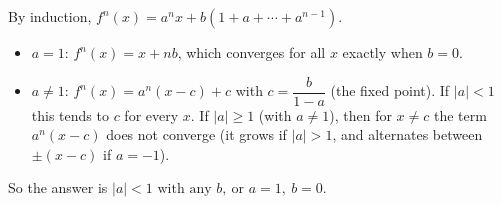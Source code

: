 By induction, $f^n(x)=a^nx+b\left(1+a+\cdots+a^{n-1}\right)$.
\begin{itemize}
\item $a=1$: $f^n(x)=x+nb$, which converges for all $x$ exactly when $b=0$.
\item $a\ne1$: $f^n(x)=a^n\left(x-c\right)+c$ with $c=\dfrac{b}{1-a}$ (the fixed point). If $|a|<1$ this tends to $c$ for every $x$. If $|a|\ge1$ (with $a\ne1$), then for $x\ne c$ the term $a^n(x-c)$ does not converge (it grows if $|a|>1$, and alternates between $\pm(x-c)$ if $a=-1$).
\end{itemize}
So the answer is $\boxed{|a|<1\text{ with any }b,\ \text{or }a=1,\ b=0}$.
